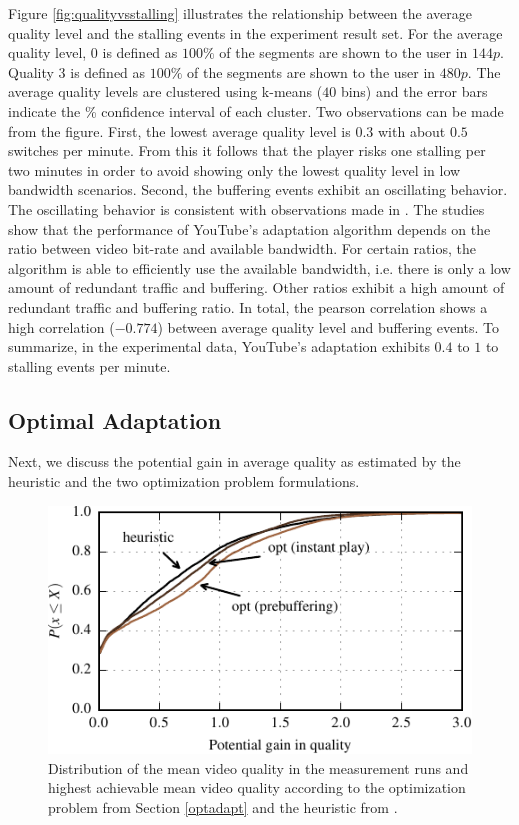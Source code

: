 Figure \ref{fig:qualityvsstalling} illustrates the relationship between the average quality level and the stalling events in the experiment result set.
For the average quality level, $0$ is defined as $100\%$ of the segments are shown to the user in $144p$. Quality $3$ is defined as $100\%$ of the segments are shown to the user in $480p$.
The average quality levels are clustered using k-means ($40$ bins) and the error bars indicate the \unit[95]{\%} confidence interval of each cluster.
Two observations can be made from the figure. 
First, the lowest average quality level is $0.3$ with about $0.5$ switches per minute.
From this it follows that the player risks one stalling per two minutes in order to avoid showing only the lowest quality level in low bandwidth scenarios.
Second, the buffering events exhibit an oscillating behavior.
The oscillating behavior is consistent with observations made in \cite{sieber16sacrificing, casas2012youtube}.
The studies show that the performance of YouTube's adaptation algorithm depends on the ratio between video bit-rate and available bandwidth.
For certain ratios, the algorithm is able to efficiently use the available bandwidth, i.e. there is only a low amount of redundant traffic and buffering.
Other ratios exhibit a high amount of redundant traffic and buffering ratio.
In total, the pearson correlation shows a high correlation ($-0.774$) between average quality level and buffering events.
To summarize, in the experimental data, YouTube's adaptation exhibits $0.4$ to $1$ to stalling events per minute.

\subsection{Optimal Adaptation}

Next, we discuss the potential gain in average quality as estimated by the heuristic and the two optimization problem formulations. 

\begin{figure}[t]
\centering
\includegraphics[width=\columnwidth]{figs/qualitygain_py}%
\caption{Distribution of the mean video quality in the measurement runs and highest achievable mean video quality according to the optimization problem from Section \ref{optadapt} and the heuristic from \cite{sieber16sacrificing}.}
\label{fig:opt}%
\end{figure}

